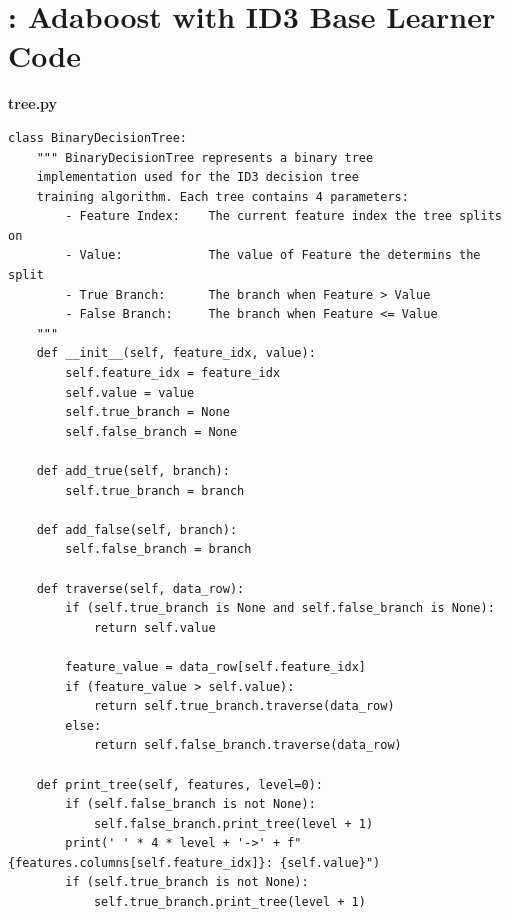 \documentclass[a4paper]{article}
\begin{document}
\newpage
\renewcommand{\thesection}{Appendix \Alph{section}}
\setcounter{section}{0} %

\newpage
\section{\hspace{-5mm}: Adaboost with ID3 Base Learner Code}
\label{section:adaboost-code}
\textbf{tree.py}
\begin{lstlisting}[basicstyle= \scriptsize]
class BinaryDecisionTree:
    """ BinaryDecisionTree represents a binary tree
    implementation used for the ID3 decision tree
    training algorithm. Each tree contains 4 parameters:
        - Feature Index:    The current feature index the tree splits on
        - Value:            The value of Feature the determins the split
        - True Branch:      The branch when Feature > Value
        - False Branch:     The branch when Feature <= Value
    """
    def __init__(self, feature_idx, value):
        self.feature_idx = feature_idx
        self.value = value
        self.true_branch = None
        self.false_branch = None

    def add_true(self, branch):
        self.true_branch = branch

    def add_false(self, branch):
        self.false_branch = branch

    def traverse(self, data_row):
        if (self.true_branch is None and self.false_branch is None):
            return self.value

        feature_value = data_row[self.feature_idx]
        if (feature_value > self.value):
            return self.true_branch.traverse(data_row)
        else:
            return self.false_branch.traverse(data_row)

    def print_tree(self, features, level=0):
        if (self.false_branch is not None):
            self.false_branch.print_tree(level + 1)
        print(' ' * 4 * level + '->' + f"{features.columns[self.feature_idx]}: {self.value}")
        if (self.true_branch is not None):
            self.true_branch.print_tree(level + 1)
\end{lstlisting}
\end{document}
